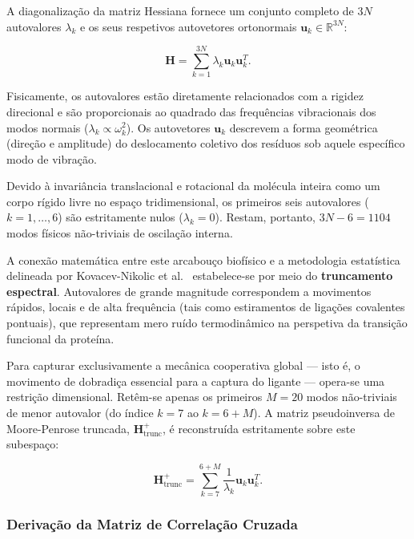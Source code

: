 \documentclass[12pt, a4paper]{article}
\begin{document}
A diagonalização da matriz Hessiana fornece um conjunto completo de $3N$ autovalores $\lambda_k$ e os seus respetivos autovetores ortonormais $\mathbf{u}_k \in \mathbb{R}^{3N}$:

\begin{equation}\label{eq:diagonalizacao}
\mathbf{H} = \sum_{k=1}^{3N} \lambda_k \mathbf{u}_k \mathbf{u}_k^T.
\end{equation}

Fisicamente, os autovalores estão diretamente relacionados com a rigidez direcional e são proporcionais ao quadrado das frequências vibracionais dos modos normais ($\lambda_k \propto \omega_k^2$). Os autovetores $\mathbf{u}_k$ descrevem a forma geométrica (direção e amplitude) do deslocamento coletivo dos resíduos sob aquele específico modo de vibração.

Devido à invariância translacional e rotacional da molécula inteira como um corpo rígido livre no espaço tridimensional, os primeiros seis autovalores ($k = 1, \ldots, 6$) são estritamente nulos ($\lambda_k = 0$). Restam, portanto, $3N - 6 = 1104$ modos físicos não-triviais de oscilação interna.

A conexão matemática entre este arcabouço biofísico e a metodologia estatística delineada por Kovacev-Nikolic et al.~\cite{kovacev2016} estabelece-se por meio do \textbf{truncamento espectral}. Autovalores de grande magnitude correspondem a movimentos rápidos, locais e de alta frequência (tais como estiramentos de ligações covalentes pontuais), que representam mero ruído termodinâmico na perspetiva da transição funcional da proteína.

Para capturar exclusivamente a mecânica cooperativa global --- isto é, o movimento de dobradiça essencial para a captura do ligante --- opera-se uma restrição dimensional. Retêm-se apenas os primeiros $M = 20$ modos não-triviais de menor autovalor (do índice $k=7$ ao $k=6+M$). A matriz pseudoinversa de Moore-Penrose truncada, $\mathbf{H}^+_{\text{trunc}}$, é reconstruída estritamente sobre este subespaço:

\begin{equation}\label{eq:pseudoinversa_truncada}
\mathbf{H}^+_{\text{trunc}} = \sum_{k=7}^{6+M} \frac{1}{\lambda_k} \mathbf{u}_k \mathbf{u}_k^T.
\end{equation}

\subsubsection{Derivação da Matriz de Correlação Cruzada}
\end{document}
